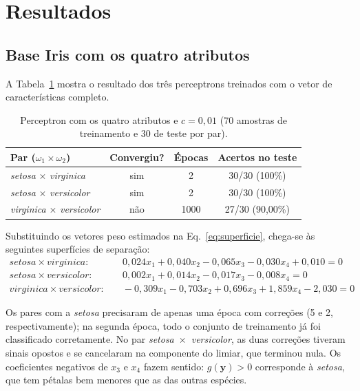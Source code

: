 \documentclass[12pt,a4paper]{article}
\begin{document}
\section{Resultados}\label{sec:resultados}

\subsection{Base Iris com os quatro atributos}

A Tabela~\ref{tab:iris4d} mostra o resultado dos três perceptrons treinados com o vetor de características completo.

\begin{table}[H]
\centering
\caption{Perceptron com os quatro atributos e $c = 0{,}01$ (70 amostras de treinamento e 30 de teste por par).}
\label{tab:iris4d}
\begin{tabular}{lccc}
\toprule
Par ($\omega_1 \times \omega_2$) & Convergiu? & Épocas & Acertos no teste \\
\midrule
\emph{setosa} $\times$ \emph{virginica}     & sim & 2    & 30/30 (100\%) \\
\emph{setosa} $\times$ \emph{versicolor}    & sim & 2    & 30/30 (100\%) \\
\emph{virginica} $\times$ \emph{versicolor} & não & 1000 & 27/30 (90,00\%) \\
\bottomrule
\end{tabular}
\end{table}

Substituindo os vetores peso estimados na Eq.~\eqref{eq:superficie}, chega-se às seguintes superfícies de separação:
\begin{align*}
\textit{setosa} \times \textit{virginica}:&\quad 0{,}024x_1 + 0{,}040x_2 - 0{,}065x_3 - 0{,}030x_4 + 0{,}010 = 0\\
\textit{setosa} \times \textit{versicolor}:&\quad 0{,}002x_1 + 0{,}014x_2 - 0{,}017x_3 - 0{,}008x_4 = 0\\
\textit{virginica} \times \textit{versicolor}:&\quad -0{,}309x_1 - 0{,}703x_2 + 0{,}696x_3 + 1{,}859x_4 - 2{,}030 = 0
\end{align*}

Os pares com a \emph{setosa} precisaram de apenas uma época com correções (5 e 2, respectivamente); na segunda época, todo o conjunto de treinamento já foi classificado corretamente. No par \emph{setosa}~$\times$~\emph{versicolor}, as duas correções tiveram sinais opostos e se cancelaram na componente do limiar, que terminou nula. Os coeficientes negativos de $x_3$ e $x_4$ fazem sentido: $g(\mathbf{y}) > 0$ corresponde à \emph{setosa}, que tem pétalas bem menores que as das outras espécies.
\end{document}
